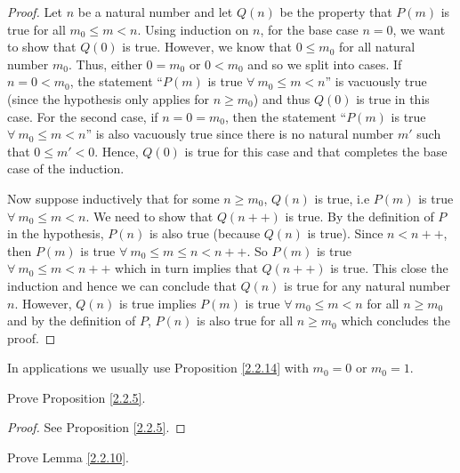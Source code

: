 \begin{proof}
Let \(n\) be a natural number and let \(Q(n)\) be the property that \(P(m)\) is true for all \(m_0 \leq m < n\).
Using induction on \(n\), for the base case \(n = 0\), we want to show that \(Q(0)\) is true.
However, we know that \(0 \leq m_0\) for all natural number \(m_0\).
Thus, either \(0 = m_0\) or \(0 < m_0\) and so we split into cases.
If \(n = 0 < m_0\), the statement ``\(P(m)\) is true \(\forall\ m_0 \leq m < n\)'' is vacuously true (since the hypothesis only applies for \(n \geq m_0\)) and thus \(Q(0)\) is true in this case.
For the second case, if \(n = 0 = m_0\), then the statement ``\(P(m)\) is true \(\forall\ m_0 \leq m < n\)'' is also vacuously true since there is no natural number \(m'\) such that \(0 \leq m' < 0\). Hence, \(Q(0)\) is true for this case and that completes the base case of the induction.

Now suppose inductively that for some \(n \geq m_0\), \(Q(n)\) is true, i.e \(P(m)\) is true \(\forall\ m_0 \leq m < n\).
We need to show that \(Q(n++)\) is true.
By the definition of \(P\) in the hypothesis, \(P(n)\) is also true (because \(Q(n)\) is true).
Since \(n < n++\), then \(P(m)\) is true \(\forall\ m_0 \leq m \leq n < n++\).
So \(P(m)\) is true \(\forall\ m_0 \leq m < n++\) which in turn implies that \(Q(n++)\) is true.
This close the induction and hence we can conclude that \(Q(n)\) is true for any natural number \(n\).
However, \(Q(n)\) is true implies \(P(m)\) is true \(\forall\ m_0 \leq m < n\) for all \(n \geq m_0\) and by the definition of \(P\), \(P(n)\) is also true for all \(n \geq m_0\) which concludes the proof.
\end{proof}

\begin{remark}\label{2.2.15}
In applications we usually use Proposition \ref{2.2.14} with \(m_0 = 0\) or \(m_0 = 1\).
\end{remark}

\exercisesection

\begin{exercise}\label{ex 2.2.1}
Prove Proposition \ref{2.2.5}.
\end{exercise}

\begin{proof}
See Proposition \ref{2.2.5}.
\end{proof}

\begin{exercise}\label{ex 2.2.2}
Prove Lemma \ref{2.2.10}.
\end{exercise}

